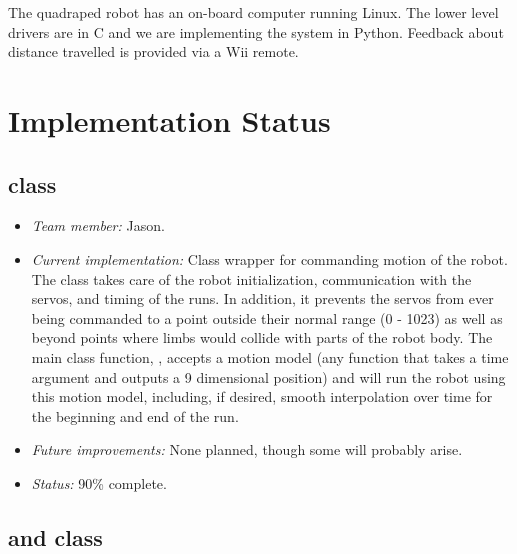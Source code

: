 The quadraped robot has an on-board computer running Linux. The lower
level drivers are in C and we are implementing the system in
Python. Feedback about distance travelled is provided via a Wii remote. 


\section{Implementation Status}


\subsection*{ class}

\begin{itemize}
\item \emph{Team member:} Jason.
\item \emph{Current implementation:} Class wrapper for commanding
  motion of the robot.  The  class takes care of the robot
  initialization, communication with the servos, and timing of the
  runs.  In addition, it prevents the servos from ever being commanded
  to a point outside their normal range (0 - 1023) as well as beyond
  points where limbs would collide with parts of the robot body.  The
  main class function, , accepts a motion model (any
  function that takes a time argument and outputs a 9 dimensional
  position) and will run the robot using this motion model, including,
  if desired, smooth interpolation over time for the beginning and end
  of the run.
\item \emph{Future improvements:} None planned, though some will
  probably arise.
\item \emph{Status:} 90\% complete.
\end{itemize}



\subsection*{ and  class}

